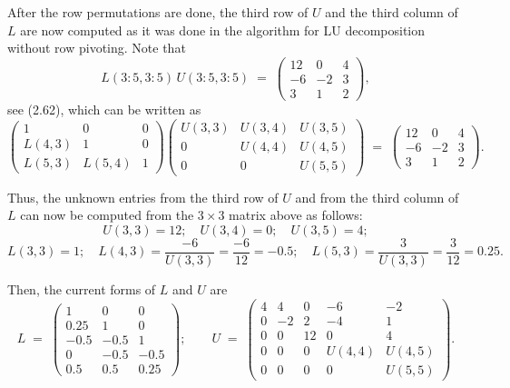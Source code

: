 After the row permutations are done, the third row of $U$ and the third
column of $L$ are now computed as it was done in the algorithm for LU
decomposition without row pivoting. Note that
\[
L(3:5,3:5)\, U(3:5,3:5) \;=\;
\begin{pmatrix} 12 & 0 & 4\\ -6 & -2 & 3\\ 3 & 1 & 2 \end{pmatrix},
\]
see (2.62), which can be written as
\[
\begin{pmatrix} 1 & 0 & 0\\ L(4,3) & 1 & 0\\ L(5,3) & L(5,4) & 1 \end{pmatrix}
\begin{pmatrix} U(3,3) & U(3,4) & U(3,5)\\ 0 & U(4,4) & U(4,5)\\ 0 & 0 & U(5,5) \end{pmatrix}
\;=\;
\begin{pmatrix} 12 & 0 & 4\\ -6 & -2 & 3\\ 3 & 1 & 2 \end{pmatrix}.
\]

Thus, the unknown entries from the third row of $U$ and from the third
column of $L$ can now be computed from the $3\times 3$ matrix above as
follows:
\[
U(3,3)=12;\quad U(3,4)=0;\quad U(3,5)=4;
\]
\[
L(3,3)=1;\quad L(4,3)=\dfrac{-6}{U(3,3)}=\dfrac{-6}{12}=-0.5;\quad
L(5,3)=\dfrac{3}{U(3,3)}=\dfrac{3}{12}=0.25.
\]

Then, the current forms of $L$ and $U$ are
\begin{equation}
L \;=\;
\begin{pmatrix} 1 & 0 & 0\\ 0.25 & 1 & 0\\ -0.5 & -0.5 & 1\\ 0 & -0.5 & -0.5\\ 0.5 & 0.5 & 0.25 \end{pmatrix}
;\qquad
U \;=\;
\begin{pmatrix}
4 & 4 & 0 & -6 & -2\\
0 & -2 & 2 & -4 & 1\\
0 & 0 & 12 & 0 & 4\\
0 & 0 & 0 & U(4,4) & U(4,5)\\
0 & 0 & 0 & 0 & U(5,5)
\end{pmatrix}.
\end{equation}

